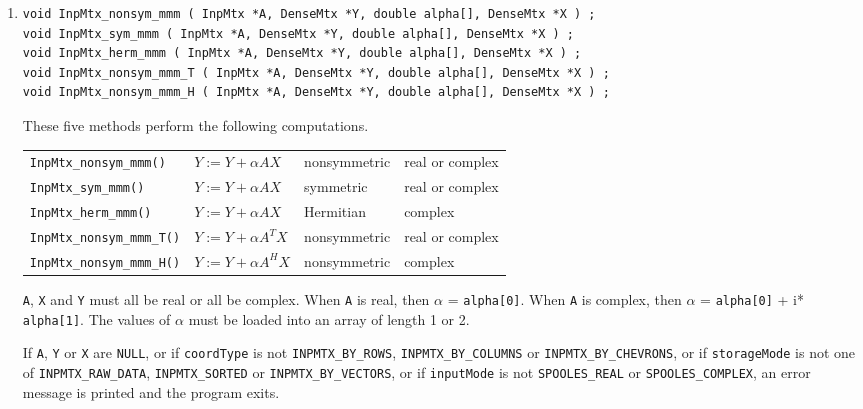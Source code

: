 \begin{enumerate}
\item
\begin{verbatim}
void InpMtx_nonsym_mmm ( InpMtx *A, DenseMtx *Y, double alpha[], DenseMtx *X ) ;
void InpMtx_sym_mmm ( InpMtx *A, DenseMtx *Y, double alpha[], DenseMtx *X ) ;
void InpMtx_herm_mmm ( InpMtx *A, DenseMtx *Y, double alpha[], DenseMtx *X ) ;
void InpMtx_nonsym_mmm_T ( InpMtx *A, DenseMtx *Y, double alpha[], DenseMtx *X ) ;
void InpMtx_nonsym_mmm_H ( InpMtx *A, DenseMtx *Y, double alpha[], DenseMtx *X ) ;
\end{verbatim}
These five methods perform the following computations.
\begin{center}
\begin{tabular}{llll}
{\tt InpMtx\_nonsym\_mmm()} 
   &  $Y := Y + \alpha A X$
   & nonsymmetric
   & real or complex \\
{\tt InpMtx\_sym\_mmm()} 
   &  $Y := Y + \alpha A X$
   & symmetric
   & real or complex \\
{\tt InpMtx\_herm\_mmm()} 
   &  $Y := Y + \alpha A X$
   & Hermitian
   & complex \\
{\tt InpMtx\_nonsym\_mmm\_T()} 
   &  $Y := Y + \alpha A^T X$
   & nonsymmetric
   & real or complex \\
{\tt InpMtx\_nonsym\_mmm\_H()} 
   &  $Y := Y + \alpha A^H X$
   & nonsymmetric
   & complex 
\end{tabular}
\end{center}
{\tt A}, {\tt X} and {\tt Y} must all be real or all be complex.
When {\tt A} is real, then $\alpha$ = {\tt alpha[0]}.
When {\tt A} is complex, then $\alpha$ = 
{\tt alpha[0]} + i* {\tt alpha[1]}.
The values of $\alpha$ must be loaded into an array of length 1 or 2.
\par {}
If {\tt A}, {\tt Y} or {\tt X} are {\tt NULL},
or if {\tt coordType} is not {\tt INPMTX\_BY\_ROWS},
{\tt INPMTX\_BY\_COLUMNS} or {\tt INPMTX\_BY\_CHEVRONS},
or if {\tt storageMode} is not one of {\tt INPMTX\_RAW\_DATA},
{\tt INPMTX\_SORTED} or {\tt INPMTX\_BY\_VECTORS},
or if {\tt inputMode} is not {\tt SPOOLES\_REAL} or
{\tt SPOOLES\_COMPLEX},
an error message is printed and the program exits.

\end{enumerate}
